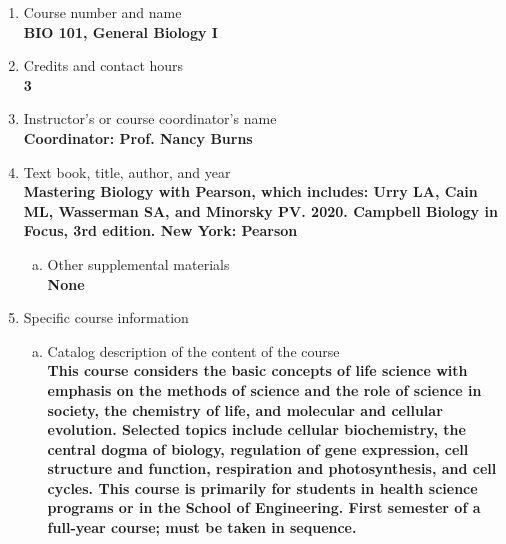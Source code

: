 \label{BIO101}  %
\begin{enumerate}[1.]
\item Course number and name\\
  {\bfseries
    BIO 101, General Biology I
  }

\item Credits and contact hours\\
  {\bfseries
    3
  }

\item Instructor's or course coordinator's name\\
  {\bfseries
    Coordinator: Prof. Nancy Burns
  }

\item Text book, title, author, and year\\
  {\bfseries
    Mastering Biology with Pearson, which includes: Urry LA, Cain ML, Wasserman SA, and Minorsky PV. 2020. Campbell Biology in Focus, 3rd edition. New York: Pearson
  }
\begin{enumerate}[a.]
\item Other supplemental materials\\
  {\bfseries
    None
  }
\end{enumerate}

\item Specific course information
\begin{enumerate}[a.]
\item Catalog description of the content of the course\\
  {\bfseries
This course considers the basic concepts of life science with emphasis on the methods of science and the role of science in society, the chemistry of life, and molecular and cellular evolution. Selected topics include cellular biochemistry, the central dogma of biology, regulation of gene expression, cell structure and function, respiration and photosynthesis, and cell cycles. This course is primarily for students in health science programs or in the School of Engineering. First semester of a full-year course; must be taken in sequence.
  }


\end{enumerate}
\end{enumerate}
